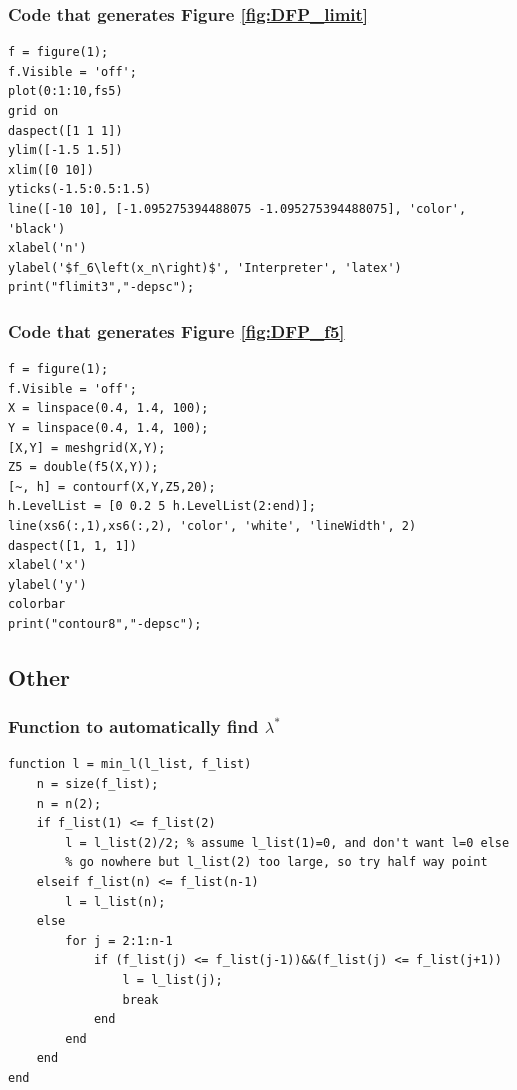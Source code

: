 \documentclass[11pt]{article} %
\let\originalleft\left
\let\originalright\right
\renewcommand{\left}{\mathopen{}\mathclose\bgroup\originalleft}
\renewcommand{\right}{\aftergroup\egroup\originalright}
\begin{document}
\subsubsection*{Code that generates Figure \ref{fig:DFP_limit}}
\begin{lstlisting}
f = figure(1);
f.Visible = 'off';
plot(0:1:10,fs5)
grid on
daspect([1 1 1])
ylim([-1.5 1.5])
xlim([0 10])
yticks(-1.5:0.5:1.5)
line([-10 10], [-1.095275394488075 -1.095275394488075], 'color', 'black')
xlabel('n')
ylabel('$f_6\left(x_n\right)$', 'Interpreter', 'latex')
print("flimit3","-depsc");
\end{lstlisting}
\subsubsection*{Code that generates Figure \ref{fig:DFP_f5}}
\begin{lstlisting}
f = figure(1);
f.Visible = 'off';
X = linspace(0.4, 1.4, 100);
Y = linspace(0.4, 1.4, 100);
[X,Y] = meshgrid(X,Y);
Z5 = double(f5(X,Y));
[~, h] = contourf(X,Y,Z5,20);
h.LevelList = [0 0.2 5 h.LevelList(2:end)];
line(xs6(:,1),xs6(:,2), 'color', 'white', 'lineWidth', 2)
daspect([1, 1, 1])
xlabel('x')
ylabel('y')
colorbar
print("contour8","-depsc");
\end{lstlisting}
\subsection*{Other}
\subsubsection*{Function to automatically find $\lambda^*$}
\begin{lstlisting}
function l = min_l(l_list, f_list)
    n = size(f_list);
    n = n(2);
    if f_list(1) <= f_list(2)
        l = l_list(2)/2; % assume l_list(1)=0, and don't want l=0 else
        % go nowhere but l_list(2) too large, so try half way point
    elseif f_list(n) <= f_list(n-1)
        l = l_list(n);
    else
        for j = 2:1:n-1
            if (f_list(j) <= f_list(j-1))&&(f_list(j) <= f_list(j+1))
                l = l_list(j);
                break
            end
        end
    end
end
\end{lstlisting}
\end{document}

